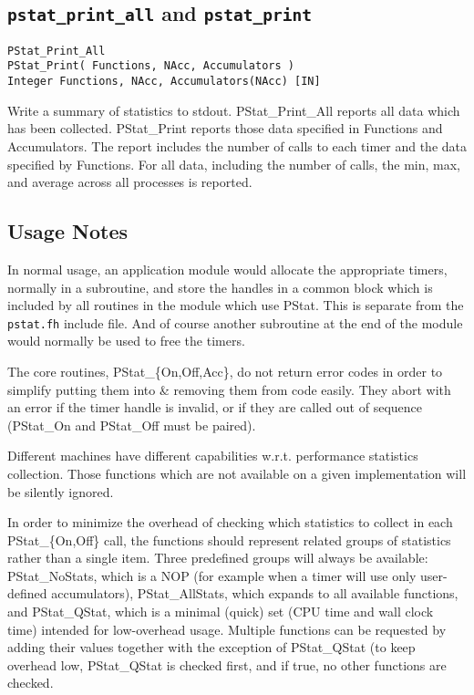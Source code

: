 \subsection{{\tt pstat\_print\_all} and {\tt pstat\_print}}
\begin{verbatim}
PStat_Print_All
PStat_Print( Functions, NAcc, Accumulators )
Integer Functions, NAcc, Accumulators(NAcc) [IN]
\end{verbatim}
Write a summary of statistics to stdout.  PStat\_Print\_All
reports all data which has been collected.  PStat\_Print
reports those data specified in Functions and Accumulators.
The report includes the number of calls to each timer and the
data specified by Functions.  For all data, including the
number of calls, the min, max, and average across all
processes is reported.
        
\subsection{Usage Notes}
In normal usage, an application module would allocate the appropriate
timers, normally in a subroutine, and store the handles in a common
block which is included by all routines in the module which use
PStat.  This is separate from the \verb+pstat.fh+ include file.
And of course another subroutine at the end of the module would
normally be used to free the timers.

The core routines, PStat\_\{On,Off,Acc\}, do not return error codes in
order to simplify putting them into \& removing them from code easily.
They abort with an error if the timer handle is invalid, or if they
are called out of sequence (PStat\_On and PStat\_Off must be paired).

Different machines have different capabilities w.r.t. performance
statistics collection.  Those functions which are not available on a
given implementation will be silently ignored.  

In order to minimize the overhead of checking which statistics to
collect in each PStat\_\{On,Off\} call, the functions should represent
related groups of statistics rather than a single item.  Three
predefined groups will always be available: PStat\_NoStats, which is a
NOP (for example when a timer will use only user-defined
accumulators), PStat\_AllStats, which expands to all available
functions, and PStat\_QStat, which is a minimal (quick) set (CPU time
and wall clock time) intended for low-overhead usage.  Multiple
functions can be requested by adding their values together with the
exception of PStat\_QStat (to keep overhead low, PStat\_QStat is checked
first, and if true, no other functions are checked.

